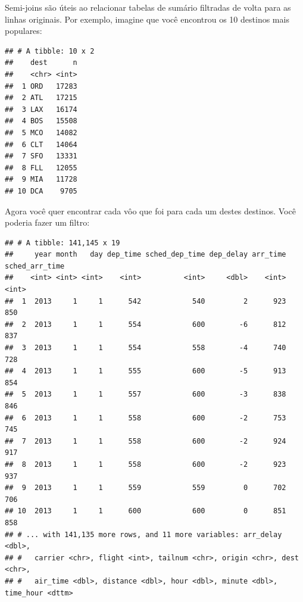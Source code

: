 \documentclass[
]{article}
\newenvironment{Shaded}{\begin{snugshade}}{\end{snugshade}}
\newcommand{\DataTypeTok}[1]{\textcolor[rgb]{0.13,0.29,0.53}{#1}}
\newcommand{\DecValTok}[1]{\textcolor[rgb]{0.00,0.00,0.81}{#1}}
\newcommand{\KeywordTok}[1]{\textcolor[rgb]{0.13,0.29,0.53}{\textbf{#1}}}
\newcommand{\NormalTok}[1]{#1}
\newcommand{\OperatorTok}[1]{\textcolor[rgb]{0.81,0.36,0.00}{\textbf{#1}}}
\newcommand{\OtherTok}[1]{\textcolor[rgb]{0.56,0.35,0.01}{#1}}
\newcommand{\StringTok}[1]{\textcolor[rgb]{0.31,0.60,0.02}{#1}}
\begin{document}
Semi-joins são úteis ao relacionar tabelas de sumário filtradas de volta
para as linhas originais. Por exemplo, imagine que você encontrou os 10
destinos mais populares:

\begin{Shaded}
\end{Shaded}

\begin{verbatim}
## # A tibble: 10 x 2
##    dest      n
##    <chr> <int>
##  1 ORD   17283
##  2 ATL   17215
##  3 LAX   16174
##  4 BOS   15508
##  5 MCO   14082
##  6 CLT   14064
##  7 SFO   13331
##  8 FLL   12055
##  9 MIA   11728
## 10 DCA    9705
\end{verbatim}

Agora você quer encontrar cada vôo que foi para cada um destes destinos.
Você poderia fazer um filtro:

\begin{Shaded}
\end{Shaded}

\begin{verbatim}
## # A tibble: 141,145 x 19
##     year month   day dep_time sched_dep_time dep_delay arr_time sched_arr_time
##    <int> <int> <int>    <int>          <int>     <dbl>    <int>          <int>
##  1  2013     1     1      542            540         2      923            850
##  2  2013     1     1      554            600        -6      812            837
##  3  2013     1     1      554            558        -4      740            728
##  4  2013     1     1      555            600        -5      913            854
##  5  2013     1     1      557            600        -3      838            846
##  6  2013     1     1      558            600        -2      753            745
##  7  2013     1     1      558            600        -2      924            917
##  8  2013     1     1      558            600        -2      923            937
##  9  2013     1     1      559            559         0      702            706
## 10  2013     1     1      600            600         0      851            858
## # ... with 141,135 more rows, and 11 more variables: arr_delay <dbl>,
## #   carrier <chr>, flight <int>, tailnum <chr>, origin <chr>, dest <chr>,
## #   air_time <dbl>, distance <dbl>, hour <dbl>, minute <dbl>, time_hour <dttm>
\end{verbatim}
\end{document}

